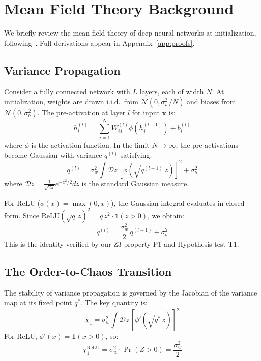 \documentclass[10pt]{article}
\begin{document}
\section{Mean Field Theory Background}
\label{sec:mft}

We briefly review the mean-field theory of deep neural networks at initialization, following~\cite{poole2016exponential,schoenholz2017deep}.
Full derivations appear in Appendix~\ref{app:proofs}.

\subsection{Variance Propagation}

Consider a fully connected network with $L$ layers, each of width $N$.
At initialization, weights are drawn i.i.d.\ from $\mathcal{N}(0, \sigma_w^2/N)$ and biases from $\mathcal{N}(0, \sigma_b^2)$.
The pre-activation at layer $l$ for input $\mathbf{x}$ is:
\begin{equation}
    h_i^{(l)} = \sum_{j=1}^{N} W_{ij}^{(l)} \phi(h_j^{(l-1)}) + b_i^{(l)}
\end{equation}
where $\phi$ is the activation function.
In the limit $N \to \infty$, the pre-activations become Gaussian with variance $q^{(l)}$ satisfying:
\begin{equation}
    q^{(l)} = \sigma_w^2 \int \mathcal{D}z\, [\phi(\sqrt{q^{(l-1)}}\, z)]^2 + \sigma_b^2
    \label{eq:variance-map}
\end{equation}
where $\mathcal{D}z = \frac{1}{\sqrt{2\pi}} e^{-z^2/2} dz$ is the standard Gaussian measure.

For ReLU ($\phi(x) = \max(0,x)$), the Gaussian integral evaluates in closed form.
Since $\text{ReLU}(\sqrt{q}\,z)^2 = q\,z^2 \cdot \mathbf{1}(z>0)$, we obtain:
\begin{equation}
    q^{(l)} = \frac{\sigma_w^2}{2}\, q^{(l-1)} + \sigma_b^2
    \label{eq:relu-variance}
\end{equation}
This is the identity verified by our Z3 property P1 and Hypothesis test T1.

\subsection{The Order-to-Chaos Transition}

The stability of variance propagation is governed by the Jacobian of the variance map at its fixed point $q^*$.
The key quantity is:
\begin{equation}
    \chi_1 = \sigma_w^2 \int \mathcal{D}z\, [\phi'(\sqrt{q^*}\, z)]^2
    \label{eq:chi1}
\end{equation}
For ReLU, $\phi'(x) = \mathbf{1}(x > 0)$, so:
\begin{equation}
    \chi_1^{\text{ReLU}} = \sigma_w^2 \cdot \Pr(Z > 0) = \frac{\sigma_w^2}{2}
    \label{eq:chi1-relu}
\end{equation}
\end{document}
